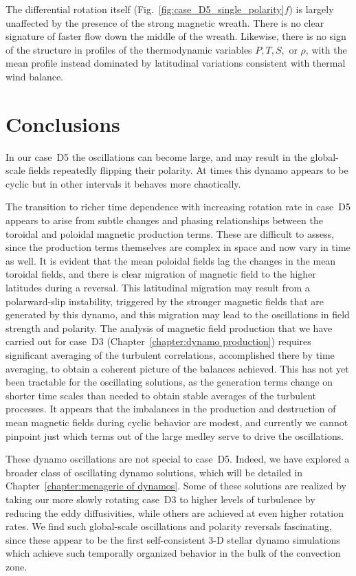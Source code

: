 The differential rotation itself
(Fig.~\ref{fig:case_D5_single_polarity}$f$) is largely
unaffected by the presence of the strong magnetic wreath.  There is no
clear signature of faster flow down the middle of the wreath.
Likewise, there is no sign of the structure in profiles of the
thermodynamic variables $P, T, S,$ or $\rho$, with the mean profile
instead dominated by latitudinal variations consistent with 
thermal wind balance. 





\section{Conclusions}

In our case~D5 the oscillations can become large, and may
result in the global-scale fields repeatedly flipping their polarity.
At times this dynamo appears to be cyclic but in other intervals it
behaves more chaotically.

The transition to richer time dependence with increasing rotation rate
in case~D5 appears to arise from subtle changes and phasing relationships
between the toroidal and poloidal magnetic production terms.  
These are difficult to assess, since the production terms themselves
are complex in space and now vary in time as well.  
It is evident that the mean poloidal fields lag the changes in the
mean toroidal fields, and there is clear migration
of magnetic field to the higher latitudes during a reversal.
This latitudinal migration may result from a polarward-slip
instability, triggered by the stronger magnetic fields that are
generated by this dynamo, and this migration may lead to the
oscillations in field strength and polarity. 
The analysis of magnetic field production that we have carried out for
case~D3 (Chapter~\ref{chapter:dynamo production}) requires
significant averaging of the turbulent correlations, accomplished there
by time averaging, to obtain a coherent picture of the balances achieved.
This has not yet been tractable for the oscillating solutions, as the
generation terms change on shorter time scales than needed to obtain
stable averages of the turbulent processes.  It appears that the
imbalances in the production and destruction of mean magnetic fields
during cyclic behavior are modest, and currently we cannot
pinpoint just which terms out of the large medley serve to drive the
oscillations. 

These dynamo oscillations are not special to case~D5. 
Indeed, we have explored a broader class of oscillating dynamo solutions,
which will be detailed in Chapter~\ref{chapter:menagerie of dynamos}.
Some of these solutions 
are realized by taking our more slowly rotating case~D3 to higher
levels of turbulence by reducing the eddy diffusivities, while
others are achieved at even higher rotation rates.  We find such
global-scale oscillations and polarity reversals fascinating, since
these appear to be the first self-consistent 3-D stellar dynamo
simulations which achieve such temporally organized behavior in the
bulk of the convection zone. 

